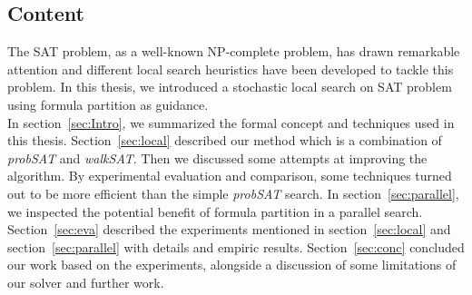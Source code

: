 \documentclass[12pt,a4paper,twoside]{scrartcl}
\numberwithin{equation}{section}
\begin{document}
\subsection{Content} 
The SAT problem, as a well-known NP-complete problem, has drawn remarkable attention and different local search heuristics have been developed to tackle this problem. In this thesis, we introduced a stochastic local search on SAT problem using formula partition as guidance. \\
In section~\ref{sec:Intro}, we summarized the formal concept and techniques used in this thesis. Section~\ref{sec:local} described our method which is a combination of  \emph{probSAT} and \emph{walkSAT}. Then we  discussed some attempts at improving the algorithm. By experimental evaluation and comparison, some techniques turned out to be more efficient than the simple \emph{probSAT} search. In section~\ref{sec:parallel}, we inspected the potential benefit of formula partition in a parallel search. Section~\ref{sec:eva} described the experiments mentioned in section~\ref{sec:local} and section~\ref{sec:parallel} with details and empiric results.  Section~\ref{sec:conc} concluded our work based on the experiments, alongside a discussion of some limitations of our solver and further work. 
\end{document}
